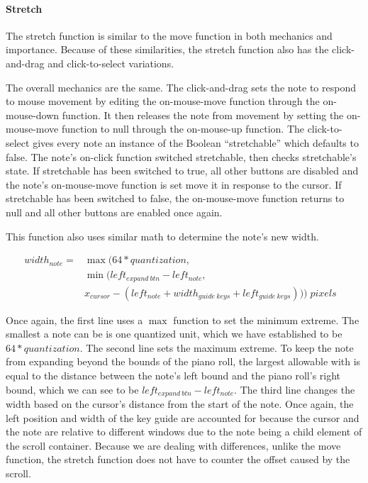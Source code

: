 \paragraph{Stretch}

The stretch function is similar to the move function in both mechanics and importance. Because of
these similarities, the stretch function also has the click-and-drag and click-to-select variations.

The overall mechanics are the same. The click-and-drag sets the note to respond to mouse movement
by editing the on-mouse-move function through the on-mouse-down function. It then releases the note
from movement by setting the on-mouse-move function to null through the on-mouse-up function. The
click-to-select gives every note an instance of the Boolean “stretchable” which defaults to false.
The note’s on-click function switched stretchable, then checks stretchable’s state. If stretchable
has been switched to true, all other buttons are disabled and the note’s on-mouse-move function is
set move it in response to the cursor. If stretchable has been switched to false, the on-mouse-move
function returns to null and all other buttons are enabled once again.

This function also uses similar math to determine the note’s new width.

\begin{align} \label{stretch}
  width_{note} = & \max( 64 * quantization,                                                           \\
                 & \min(left_{expand\:btn} - left_{note},                                             \\
                 & x_{cursor} - (left_{note} + width_{guide\:keys} + left_{guide\:keys}))) \;pixels &
\end{align}

Once again, the first line uses a $ \max $ function to set the minimum extreme. The smallest a note
can be is one quantized unit, which we have established to be $ 64 * quantization $. The second
line sets the maximum extreme. To keep the note from expanding beyond the bounds of the piano roll,
the largest allowable with is equal to the distance between the note’s left bound and the piano
roll’s right bound, which we can see to be $ left_{expand\:btn} - left_{note} $. The third line
changes the width based on the cursor’s distance from the start of the note. Once again, the left
position and width of the key guide are accounted for because the cursor and the note are relative
to different windows due to the note being a child element of the scroll container. Because we are
dealing with differences, unlike the move function, the stretch function does not have to counter
the offset caused by the scroll.

